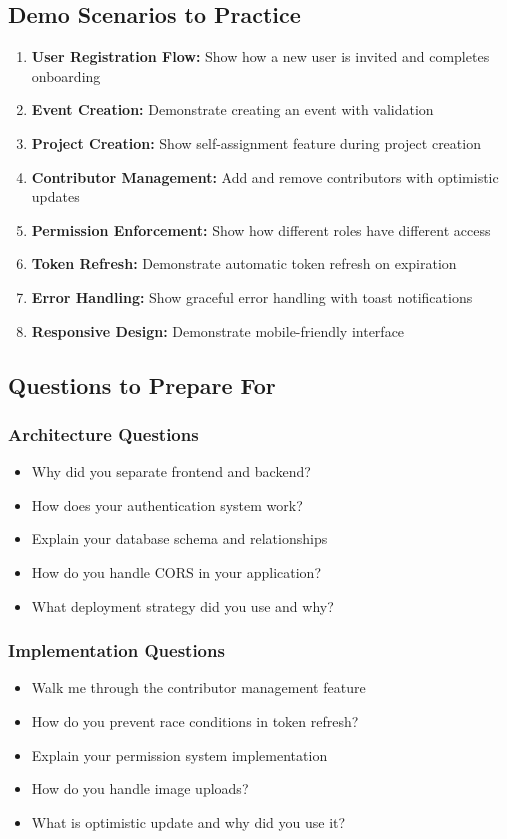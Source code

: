 \documentclass[11pt,a4paper]{article}
\begin{document}
\subsection{Demo Scenarios to Practice}
\begin{enumerate}[leftmargin=*]
    \item \textbf{User Registration Flow:} Show how a new user is invited and completes onboarding
    \item \textbf{Event Creation:} Demonstrate creating an event with validation
    \item \textbf{Project Creation:} Show self-assignment feature during project creation
    \item \textbf{Contributor Management:} Add and remove contributors with optimistic updates
    \item \textbf{Permission Enforcement:} Show how different roles have different access
    \item \textbf{Token Refresh:} Demonstrate automatic token refresh on expiration
    \item \textbf{Error Handling:} Show graceful error handling with toast notifications
    \item \textbf{Responsive Design:} Demonstrate mobile-friendly interface
\end{enumerate}

\subsection{Questions to Prepare For}

\subsubsection{Architecture Questions}
\begin{itemize}[leftmargin=*]
    \item Why did you separate frontend and backend?
    \item How does your authentication system work?
    \item Explain your database schema and relationships
    \item How do you handle CORS in your application?
    \item What deployment strategy did you use and why?
\end{itemize}

\subsubsection{Implementation Questions}
\begin{itemize}[leftmargin=*]
    \item Walk me through the contributor management feature
    \item How do you prevent race conditions in token refresh?
    \item Explain your permission system implementation
    \item How do you handle image uploads?
    \item What is optimistic update and why did you use it?
\end{itemize}
\end{document}
